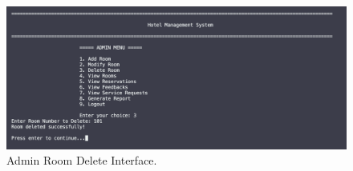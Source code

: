 \documentclass[12pt,a4paper]{article}
\begin{document}
\begin{figure}[!htbp]
    \centering
    \includegraphics[width=\linewidth]{room_delete.png} %
    \caption{Admin Room Delete Interface.}
\end{figure}
\end{document}
